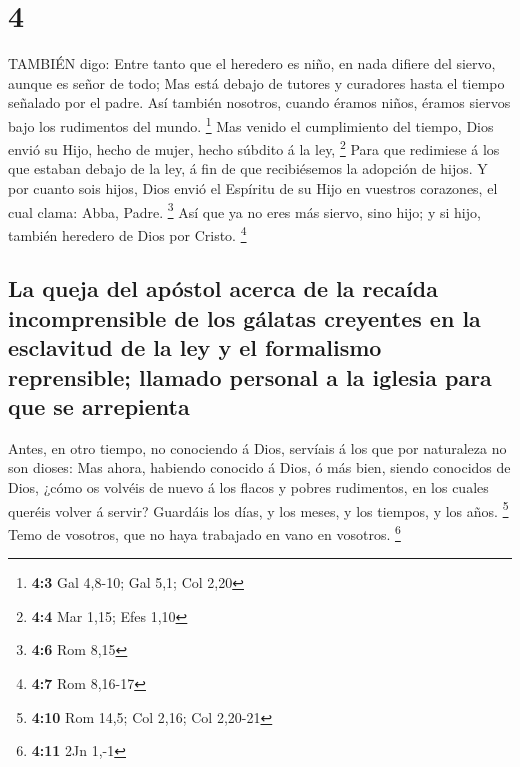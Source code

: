 \hypertarget{section-3}{%
\section{4}\label{section-3}}

 TAMBIÉN digo: Entre tanto que el heredero es niño, en nada
difiere del siervo, aunque es señor de todo;  Mas está
debajo de tutores y curadores hasta el tiempo señalado por el padre.
 Así también nosotros, cuando éramos niños, éramos siervos
bajo los rudimentos del mundo. \footnote{\textbf{4:3} Gal 4,8-10; Gal
  5,1; Col 2,20}  Mas venido el cumplimiento del tiempo,
Dios envió su Hijo, hecho de mujer, hecho súbdito á la ley, \footnote{\textbf{4:4}
  Mar 1,15; Efes 1,10}  Para que redimiese á los que estaban
debajo de la ley, á fin de que recibiésemos la adopción de hijos.
 Y por cuanto sois hijos, Dios envió el Espíritu de su Hijo
en vuestros corazones, el cual clama: Abba, Padre. \footnote{\textbf{4:6}
  Rom 8,15}  Así que ya no eres más siervo, sino hijo; y si
hijo, también heredero de Dios por Cristo. \footnote{\textbf{4:7} Rom
  8,16-17}

\hypertarget{la-queja-del-apuxf3stol-acerca-de-la-recauxedda-incomprensible-de-los-guxe1latas-creyentes-en-la-esclavitud-de-la-ley-y-el-formalismo-reprensible-llamado-personal-a-la-iglesia-para-que-se-arrepienta}{%
\subsection{La queja del apóstol acerca de la recaída incomprensible de
los gálatas creyentes en la esclavitud de la ley y el formalismo
reprensible; llamado personal a la iglesia para que se
arrepienta}\label{la-queja-del-apuxf3stol-acerca-de-la-recauxedda-incomprensible-de-los-guxe1latas-creyentes-en-la-esclavitud-de-la-ley-y-el-formalismo-reprensible-llamado-personal-a-la-iglesia-para-que-se-arrepienta}}

 Antes, en otro tiempo, no conociendo á Dios, servíais á los
que por naturaleza no son dioses:  Mas ahora, habiendo
conocido á Dios, ó más bien, siendo conocidos de Dios, ¿cómo os volvéis
de nuevo á los flacos y pobres rudimentos, en los cuales queréis volver
á servir?  Guardáis los días, y los meses, y los tiempos, y
los años. \footnote{\textbf{4:10} Rom 14,5; Col 2,16; Col 2,20-21}
 Temo de vosotros, que no haya trabajado en vano en
vosotros. \footnote{\textbf{4:11} 2Jn 1,-1}

